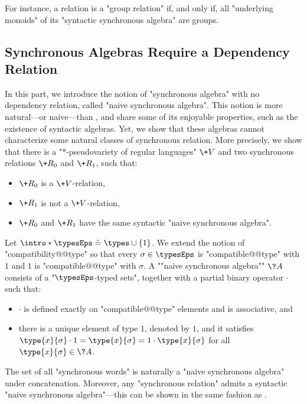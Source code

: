 For instance, a relation is a "group relation" if, and only if, all
"underlying monoids" of its "syntactic synchronous algebra" are
groups. 

\subsection{Synchronous Algebras Require a Dependency Relation}
\label{sec:counterexample}

In this part, we introduce the notion of "synchronous algebra" with no dependency relation, 
called "naive synchronous algebra". This notion is more natural---or naive---than
, and share some of its enjoyable properties, such as the existence of syntactic algebras. Yet, we show that these algebras cannot characterize some
natural classes of synchronous relation. More precisely, we show that there
is a "$\ast$-pseudovariety of regular languages" $\+V$ and two synchronous relations
$\+R_0$ and $\+R_1$, such that:
\begin{itemize}
	\item $\+R_0$ is a $\+V$-relation,
	\item $\+R_1$ is not a $\+V$-relation,
	\item $\+R_0$ and $\+R_1$ have the same syntactic "naive synchronous algebra".
\end{itemize}

\begin{definition}
	Let $\intro*\typesEps \defeq \types \cup \{1\}$. We extend the notion of "compatibility@@type" so 
	that every $\sigma \in \typesEps$ is "compatible@@type" with $1$ and
	$1$ is "compatible@@type" with $\sigma$.
	A \AP""naive synchronous algebra"" $\?A$ consists of a "$\typesEps$-typed sets",
	together with a partial binary operator $\cdot$ such that:
	\begin{itemize}
		\item $\cdot$ is defined exactly on "compatible@@type" elements and is associative, and
		\item there is a unique element of type $1$, denoted by $1$, and it satisfies
			$\type{x}{\sigma} \cdot 1 = \type{x}{\sigma} = 1 \cdot \type{x}{\sigma}$
			for all $\type{x}{\sigma} \in \?A$.
	\end{itemize}
\end{definition}

The set of all "synchronous words" is naturally a "naive synchronous algebra" under concatenation.
Moreover, any "synchronous relation" admits a syntactic "naive synchronous algebra"---this can be shown in the same fashion as .

